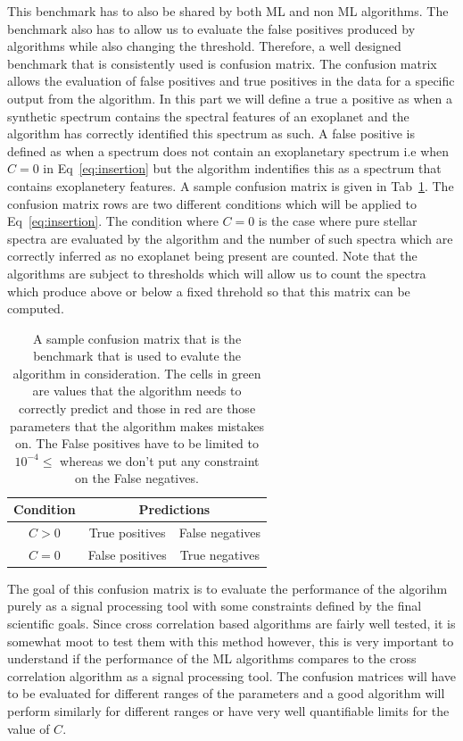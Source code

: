 This benchmark has to also be shared by both ML and non ML algorithms. 
The benchmark also has to allow us to evaluate the false positives produced by algorithms while also changing the threshold. 
Therefore, a well designed benchmark that is consistently used is confusion matrix.
The confusion matrix allows the evaluation of false positives and true positives in the data for a specific output from the algorithm.
In this part we will define a true a positive as when a synthetic spectrum contains the spectral features of an exoplanet and the algorithm has correctly identified this spectrum as such.
A false positive is defined as when a spectrum does not contain an exoplanetary spectrum i.e when $C=0$ in Eq~\ref{eq:insertion} but the algorithm indentifies this as a spectrum that contains exoplanetery features.
A sample confusion matrix is given in Tab~\ref{tab:sample_cm}. 
The confusion matrix rows are two different conditions which will be applied to Eq~\ref{eq:insertion}.
The condition where $C=0$ is the case where pure stellar spectra are evaluated by the algorithm and the number of such spectra which are correctly inferred as no exoplanet being present are counted.
Note that the algorithms are subject to thresholds which will allow us to count the spectra which produce above or below a fixed threhold so that this matrix can be computed.
\begin{table}[ht!]
    \centering
    \begin{tabular}{|c|c|c|}
    \hline
    Condition&  \multicolumn{2}{|c|}{ Predictions}\\
    \hline
        $C>0$ &\cellcolor{green!50}  True positives& \cellcolor{red!50}False negatives\\
        \hline
        $C=0$ &  \cellcolor{red!50}False positives& \cellcolor{green!50}True negatives\\
        \hline
    \end{tabular}
    \caption{A sample confusion matrix that is the benchmark that is used to evalute the algorithm in consideration. 
    The cells in green are values that the algorithm needs to correctly predict and those in red are those parameters that the algorithm makes mistakes on.
    The False positives have to be limited to $10^{-4}\le$ whereas we don't put any constraint on the False negatives.}
    \label{tab:sample_cm}
\end{table}
The goal of this confusion matrix is to evaluate the performance of the algorihm purely as a signal processing tool with some constraints defined by the final scientific goals. 
Since cross correlation based algorithms are fairly well tested, it is somewhat moot to test them with this method however, this is very important to understand if the performance of the ML algorithms compares to the cross correlation algorithm as a signal processing tool.
The confusion matrices will have to be evaluated for different ranges of the parameters and a good algorithm will perform similarly for different ranges or have very well quantifiable limits for the value of $C$.
